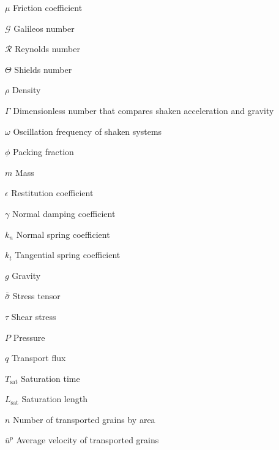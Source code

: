 
\begin{simbolos}
    \item[$\mu$] Friction coefficient
    \item[$\mathcal{G}$] Galileos number
    \item[$\mathcal{R}$] Reynolds number
    \item[$\Theta$] Shields number
    \item[$\rho$] Density
    \item[$\Gamma$] Dimensionless number that compares shaken acceleration and gravity
    \item[$\omega$] Oscillation frequency of shaken systems
    \item[$\phi$] Packing fraction
    \item[$m$] Mass
    \item[$\epsilon$] Restitution coefficient
    \item[$\gamma$] Normal damping coefficient
    \item[$k_n$] Normal spring coefficient
    \item[$k_t$] Tangential spring coefficient
    \item[$g$] Gravity
    \item[$\bar{\bar{\sigma}}$] Stress tensor
    \item[$\tau$] Shear stress
    \item[$P$] Pressure
    \item[$q$] Transport flux
    \item[$T_\textrm{sat}$] Saturation time
    \item[$L_\textrm{sat}$] Saturation length
    \item[$n$] Number of transported grains by area
    \item[$\bar{u}^p$] Average velocity of transported grains
\end{simbolos}
